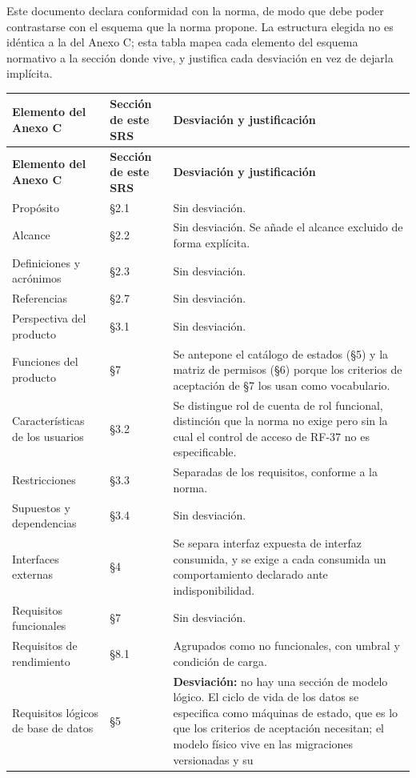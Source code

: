 \documentclass[11pt,a4paper]{article}
\begin{document}
Este documento declara conformidad con la norma, de modo que debe poder contrastarse con el
esquema que la norma propone. La estructura elegida no es idéntica a la del Anexo C; esta tabla
mapea cada elemento del esquema normativo a la sección donde vive, y justifica cada desviación
en vez de dejarla implícita.

\begin{longtable}{p{5.1cm} p{4.1cm} p{5.2cm}}
\toprule
\textbf{Elemento del Anexo C} & \textbf{Sección de este SRS} & \textbf{Desviación y
justificación} \\
\midrule
\endfirsthead
\toprule
\textbf{Elemento del Anexo C} & \textbf{Sección de este SRS} & \textbf{Desviación y
justificación} \\
\midrule
\endhead
Propósito & \S2.1 & Sin desviación. \\
Alcance & \S2.2 & Sin desviación. Se añade el alcance excluido de forma explícita. \\
Definiciones y acrónimos & \S2.3 & Sin desviación. \\
Referencias & \S2.7 & Sin desviación. \\
Perspectiva del producto & \S3.1 & Sin desviación. \\
Funciones del producto & \S7 & Se antepone el catálogo de estados (\S5) y la matriz de permisos
(\S6) porque los criterios de aceptación de \S7 los usan como vocabulario. \\
Características de los usuarios & \S3.2 & Se distingue rol de cuenta de rol funcional, distinción
que la norma no exige pero sin la cual el control de acceso de RF-37 no es especificable. \\
Restricciones & \S3.3 & Separadas de los requisitos, conforme a la norma. \\
Supuestos y dependencias & \S3.4 & Sin desviación. \\
Interfaces externas & \S4 & Se separa interfaz expuesta de interfaz consumida, y se exige a cada
consumida un comportamiento declarado ante indisponibilidad. \\
Requisitos funcionales & \S7 & Sin desviación. \\
Requisitos de rendimiento & \S8.1 & Agrupados como no funcionales, con umbral y condición de
carga. \\
Requisitos lógicos de base de datos & \S5 & \textbf{Desviación:} no hay una sección de modelo
lógico. El ciclo de vida de los datos se especifica como máquinas de estado, que es lo que los
criterios de aceptación necesitan; el modelo físico vive en las migraciones versionadas y su

\end{longtable}
\end{document}
